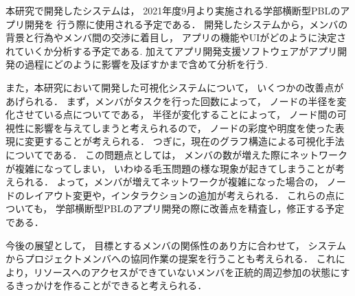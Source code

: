 
本研究で開発したシステムは，
2021年度9月より実施される学部横断型PBLのアプリ開発を
行う際に使用される予定である．
開発したシステムから，メンバの背景と行為やメンバ間の交渉に着目し，
アプリの機能やUIがどのように決定されていくか分析する予定である.
加えてアプリ開発支援ソフトウェアがアプリ開発の過程にどのように影響を及ぼすかまで含めて分析を行う.

また，本研究において開発した可視化システムについて，
いくつかの改善点があげられる．
まず，メンバがタスクを行った回数によって，
ノードの半径を変化させている点についてである，
半径が変化することによって，
ノード間の可視性に影響を与えてしまうと考えられるので，
ノードの彩度や明度を使った表現に変更することが考えられる．
つぎに，現在のグラフ構造による可視化手法についてである．
この問題点としては，
メンバの数が増えた際にネットワークが複雑になってしまい，
いわゆる毛玉問題の様な現象が起きてしまうことが考えられる．
よって，メンバが増えてネットワークが複雑になった場合の，
ノードのレイアウト変更や，インタラクションの追加が考えられる．
これらの点についても，
学部横断型PBLのアプリ開発の際に改善点を精査し，修正する予定である．

今後の展望として，
目標とするメンバの関係性のあり方に合わせて，
システムからプロジェクトメンバへの協同作業の提案を行うことも考えられる．
これにより，リソースへのアクセスができていないメンバを正統的周辺参加の状態にするきっかけを作ることができると考えられる．
